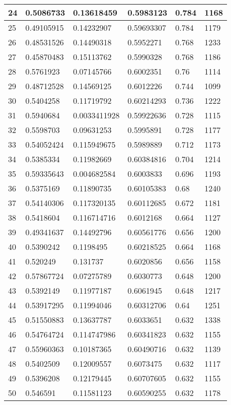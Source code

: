 \begin{longtable}{|l|l|l|l|l|l|}
24 & 0.5086733 & 0.13618459 & 0.5983123 & 0.784 & 1168 \\ \hline 
25 & 0.49105915 & 0.14232907 & 0.59693307 & 0.784 & 1179 \\ \hline 
26 & 0.48531526 & 0.14490318 & 0.5952271 & 0.768 & 1233 \\ \hline 
27 & 0.45870483 & 0.15113762 & 0.5990328 & 0.768 & 1186 \\ \hline 
28 & 0.5761923 & 0.07145766 & 0.6002351 & 0.76 & 1114 \\ \hline 
29 & 0.48712528 & 0.14569125 & 0.6012226 & 0.744 & 1099 \\ \hline 
30 & 0.5404258 & 0.11719792 & 0.60214293 & 0.736 & 1222 \\ \hline 
31 & 0.5940684 & 0.0033411928 & 0.59922636 & 0.728 & 1115 \\ \hline 
32 & 0.5598703 & 0.09631253 & 0.5995891 & 0.728 & 1177 \\ \hline 
33 & 0.54052424 & 0.115949675 & 0.5989889 & 0.712 & 1173 \\ \hline 
34 & 0.5385334 & 0.11982669 & 0.60384816 & 0.704 & 1214 \\ \hline 
35 & 0.59335643 & 0.004682584 & 0.6003833 & 0.696 & 1193 \\ \hline 
36 & 0.5375169 & 0.11890735 & 0.60105383 & 0.68 & 1240 \\ \hline 
37 & 0.54140306 & 0.117320135 & 0.60112685 & 0.672 & 1181 \\ \hline 
38 & 0.5418604 & 0.116714716 & 0.6012168 & 0.664 & 1127 \\ \hline 
39 & 0.49341637 & 0.14492796 & 0.60561776 & 0.656 & 1200 \\ \hline 
40 & 0.5390242 & 0.1198495 & 0.60218525 & 0.664 & 1168 \\ \hline 
41 & 0.520249 & 0.131737 & 0.6020856 & 0.656 & 1158 \\ \hline 
42 & 0.57867724 & 0.07275789 & 0.6030773 & 0.648 & 1200 \\ \hline 
43 & 0.5392149 & 0.11977187 & 0.6061945 & 0.648 & 1217 \\ \hline 
44 & 0.53917295 & 0.11994046 & 0.60312706 & 0.64 & 1251 \\ \hline 
45 & 0.51550883 & 0.13637787 & 0.6033651 & 0.632 & 1338 \\ \hline 
46 & 0.54764724 & 0.114747986 & 0.60341823 & 0.632 & 1155 \\ \hline 
47 & 0.55960363 & 0.10187365 & 0.60490716 & 0.632 & 1139 \\ \hline 
48 & 0.5402509 & 0.12009557 & 0.6073475 & 0.632 & 1117 \\ \hline 
49 & 0.5396208 & 0.12179445 & 0.60707605 & 0.632 & 1155 \\ \hline 
50 & 0.546591 & 0.11581123 & 0.60590255 & 0.632 & 1178 \\ \hline 
\end{longtable}